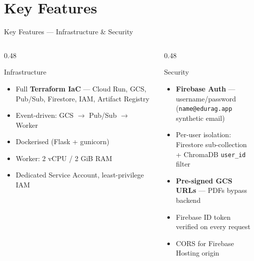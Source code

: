 \documentclass[aspectratio=169]{beamer}
\begin{document}
\section{Key Features}

\begin{frame}[t,shrink=3]{Key Features — Infrastructure \& Security}
  \begin{columns}[t]
    \begin{column}{0.48\textwidth}
      \begin{block}{Infrastructure}
        \begin{itemize}\setlength\itemsep{0.2em}
          \item Full \textbf{Terraform IaC} — Cloud Run, GCS,
                Pub/Sub, Firestore, IAM, Artifact Registry
          \item Event-driven: GCS $\to$ Pub/Sub $\to$ Worker
          \item Dockerised (Flask + gunicorn)
          \item Worker: 2 vCPU / 2 GiB RAM
          \item Dedicated Service Account, least-privilege IAM
        \end{itemize}
      \end{block}
    \end{column}
    \begin{column}{0.48\textwidth}
      \begin{block}{Security}
        \begin{itemize}\setlength\itemsep{0.2em}
          \item \textbf{Firebase Auth} — username/password\\
                (\texttt{name@edurag.app} synthetic email)
          \item Per-user isolation: Firestore sub-collection\\
                + ChromaDB \texttt{user\_id} filter
          \item \textbf{Pre-signed GCS URLs} — PDFs bypass backend
          \item Firebase ID token verified on every request
          \item CORS for Firebase Hosting origin
        \end{itemize}
      \end{block}
    \end{column}
  \end{columns}
\end{frame}
\end{document}

